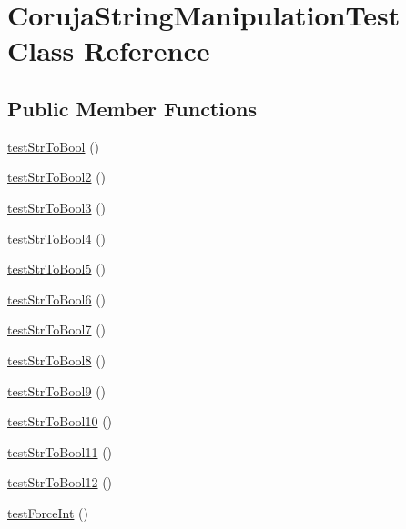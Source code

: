 \hypertarget{class_coruja_string_manipulation_test}{
\section{CorujaStringManipulationTest Class Reference}
\label{class_coruja_string_manipulation_test}
}
\subsection*{Public Member Functions}
\begin{CompactItemize}
\item 
\hyperlink{class_coruja_string_manipulation_test_6ba9d3e266cdfc669d7904795602db0d}{testStrToBool} ()
\item 
\hyperlink{class_coruja_string_manipulation_test_e43a3b51d6e27bc7600ded153c1f2f7f}{testStrToBool2} ()
\item 
\hyperlink{class_coruja_string_manipulation_test_dc99487f3aea88d98e3d7c6ce24130e4}{testStrToBool3} ()
\item 
\hyperlink{class_coruja_string_manipulation_test_1e5d231a226f2fdf80ea7f4318362477}{testStrToBool4} ()
\item 
\hyperlink{class_coruja_string_manipulation_test_a23a98078ee7b539a76def263a56e32b}{testStrToBool5} ()
\item 
\hyperlink{class_coruja_string_manipulation_test_69c87bb16246b88a4ada9edd20b358b3}{testStrToBool6} ()
\item 
\hyperlink{class_coruja_string_manipulation_test_7f4c2f5020265f3cc1ea93c246093e39}{testStrToBool7} ()
\item 
\hyperlink{class_coruja_string_manipulation_test_f5486fbb3bfa9f83b9d54f3adc759b12}{testStrToBool8} ()
\item 
\hyperlink{class_coruja_string_manipulation_test_79af956835fa8fd185d207c90f4074d0}{testStrToBool9} ()
\item 
\hyperlink{class_coruja_string_manipulation_test_68caed8655cf92e49e562fc00625b76e}{testStrToBool10} ()
\item 
\hyperlink{class_coruja_string_manipulation_test_5ebaf5984de13c29f0171a270686bb51}{testStrToBool11} ()
\item 
\hyperlink{class_coruja_string_manipulation_test_cf9704596987fd7a711ff3efaaaaf8c6}{testStrToBool12} ()
\item 
\hyperlink{class_coruja_string_manipulation_test_e0bbe1a9e75c255feb3610baa5ac4f53}{testForceInt} ()
\item 

\end{CompactItemize}
